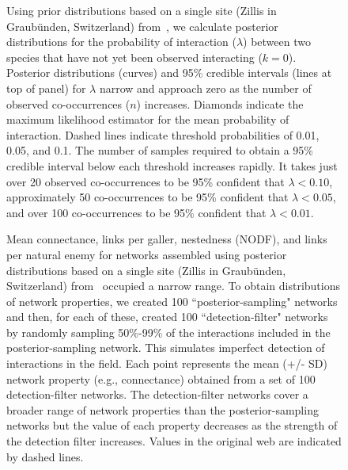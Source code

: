 \documentclass[12pt]{article}
\begin{document}
  \begin{figure}[h!]
    \caption{Using prior distributions based on a single site (Zillis in Graub\"{u}nden, Switzerland) from~\citet{Kopelke2017}, we calculate posterior distributions for the probability of interaction ($\lambda$) between two species that have not yet been observed interacting ($k = 0$). 
    Posterior distributions (curves) and 95\% credible intervals (lines at top of panel) for $\lambda$ narrow and approach zero as the number of observed co-occurrences ($n$) increases. Diamonds indicate the maximum likelihood estimator for the mean probability of interaction.
    Dashed lines indicate threshold probabilities of 0.01, 0.05, and 0.1. The number of samples required to obtain a 95\% credible interval below each threshold increases rapidly. It takes just over 20 observed co-occurrences to be 95\% confident that $\lambda<0.10$, approximately 50 co-occurrences to be 95\% confident that $\lambda<0.05$, and over 100 co-occurrences to be 95\% confident that $\lambda<0.01$.}
    \label{Salix_pdfs_cdfs}
    \begin{center}
    \end{center}
    \end{figure}


  \begin{figure}[h!]
    \caption{Mean connectance, links per galler, nestedness (NODF), and links per natural enemy for networks assembled using posterior distributions based on a single site (Zillis in Graub\"{u}nden, Switzerland) from~\citet{Kopelke2017} occupied a narrow range. To obtain distributions of network properties, we created 100 ``posterior-sampling" networks and then, for each of these, created 100 ``detection-filter" networks by randomly sampling 50\%-99\% of the interactions included in the posterior-sampling network. This simulates imperfect detection of interactions in the field. Each point represents the mean (+/- SD) network property (e.g., connectance) obtained from a set of 100 detection-filter networks. The detection-filter networks cover a broader range of network properties than the posterior-sampling networks but the value of each property decreases as the strength of the detection filter increases. Values in the original web are indicated by dashed lines.}
    \label{posterior_webs}    
    \begin{center}
    \end{center}
    \end{figure}


\clearpage

     
\end{document}
